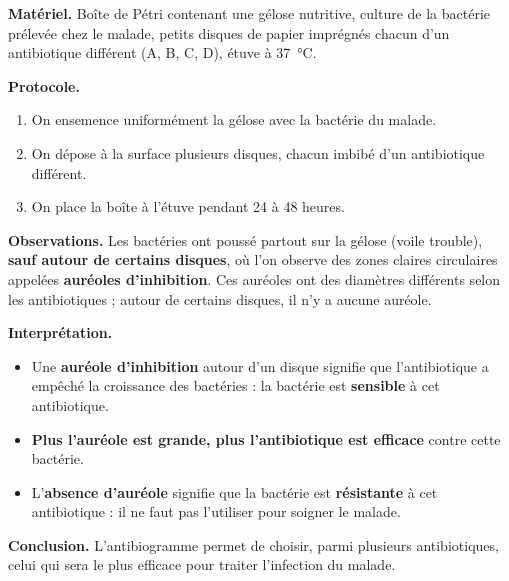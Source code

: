 \documentclass[11pt]{article}
\begin{document}
\begin{experience}
\textbf{Matériel.} Boîte de Pétri contenant une gélose nutritive, culture de la bactérie prélevée chez le malade, petits disques de papier imprégnés chacun d'un antibiotique différent (A, B, C, D), étuve à \SI{37}{\celsius}.

\textbf{Protocole.}
\begin{enumerate}
\item On ensemence uniformément la gélose avec la bactérie du malade.
\item On dépose à la surface plusieurs disques, chacun imbibé d'un antibiotique différent.
\item On place la boîte à l'étuve pendant 24 à 48 heures.
\end{enumerate}

\textbf{Observations.} Les bactéries ont poussé partout sur la gélose (voile trouble), \textbf{sauf autour de certains disques}, où l'on observe des zones claires circulaires appelées \textbf{auréoles d'inhibition}. Ces auréoles ont des diamètres différents selon les antibiotiques ; autour de certains disques, il n'y a aucune auréole.

\textbf{Interprétation.}
\begin{itemize}
\item Une \textbf{auréole d'inhibition} autour d'un disque signifie que l'antibiotique a empêché la croissance des bactéries : la bactérie est \textbf{sensible} à cet antibiotique.
\item \textbf{Plus l'auréole est grande, plus l'antibiotique est efficace} contre cette bactérie.
\item L'\textbf{absence d'auréole} signifie que la bactérie est \textbf{résistante} à cet antibiotique : il ne faut pas l'utiliser pour soigner le malade.
\end{itemize}

\textbf{Conclusion.} L'antibiogramme permet de choisir, parmi plusieurs antibiotiques, celui qui sera le plus efficace pour traiter l'infection du malade.
\end{experience}
\end{document}
